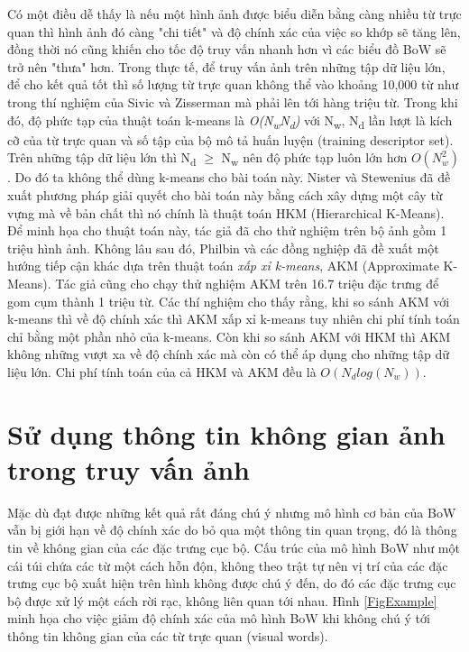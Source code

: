 Có một điều dễ thấy là nếu một hình ảnh được biểu diễn bằng càng nhiều từ trực quan thì hình ảnh đó càng "chi tiết" và độ chính xác của việc so khớp sẽ tăng lên, đồng thời nó cũng khiến cho tốc độ truy vấn nhanh hơn vì các biểu đồ BoW sẽ trở nên "thưa" hơn. Trong thực tế, để truy vấn ảnh trên những tập dữ liệu lớn, để cho kết quả tốt thì số lượng từ trực quan không thể vào khoảng 10,000 từ như trong thí nghiệm của Sivic và Zisserman \cite{sivic2003video} mà phải lên tới hàng triệu từ. Trong khi đó, độ phức tạp của thuật toán k-means là \textit{O(N\textsubscript{w}N\textsubscript{d})} với N\textsubscript{w}, N\textsubscript{d} lần lượt là kích cỡ của từ trực quan và số tập của bộ mô tả huấn luyện (training descriptor set). Trên những tập dữ liệu lớn thì N\textsubscript{d} $\geq$ N\textsubscript{w} nên độ phức tạp luôn lớn hơn $O(N^2_w)$. Do đó ta không thể dùng k-means cho bài toán này. Nister và Stewenius \cite{nister2006scalable} đã đề xuất phương pháp giải quyết cho bài toán này bằng cách xây dựng một cây từ vựng mà về bản chất thì nó chính là thuật toán HKM (Hierarchical K-Means). Để minh họa cho thuật toán này, tác giả đã cho thử nghiệm trên bộ ảnh gồm 1 triệu hình ảnh. Không lâu sau đó, Philbin và các đồng nghiệp \cite{philbin2007object} đã đề xuất một hướng tiếp cận khác dựa trên thuật toán \textit{xấp xỉ k-means}, AKM (Approximate K-Means). Tác giả cũng cho chạy thử nghiệm AKM trên 16.7 triệu đặc trưng để gom cụm thành 1 triệu từ. Các thí nghiệm cho thấy rằng, khi so sánh AKM với k-means thì về độ chính xác thì AKM xấp xỉ k-means tuy nhiên chi phí tính toán chỉ bằng một phần nhỏ của k-means. Còn khi so sánh AKM với HKM thì AKM không những vượt xa về độ chính xác mà còn có thể áp dụng cho những tập dữ liệu lớn. Chi phí tính toán của cả HKM và AKM đều là $O(N_d log(N_w))$.

\section{Sử dụng thông tin không gian ảnh trong truy vấn ảnh}
\label{spatial}

Mặc dù đạt được những kết quả rất đáng chú ý nhưng mô hình cơ bản của BoW vẫn bị giới hạn về độ chính xác do bỏ qua một thông tin quan trọng, đó là thông tin về không gian của các đặc trưng cục bộ. Cấu trúc của mô hình BoW như một cái túi chứa các từ một cách hỗn độn, không theo trật tự nên vị trí của các đặc trưng cục bộ xuất hiện trên hình không được chú ý đến, do đó các đặc trưng cục bộ được xử lý một cách rời rạc, không liên quan tới nhau. Hình \ref{FigExample} minh họa cho việc giảm độ chính xác của mô hình BoW khi không chú ý tới thông tin không gian của các từ trực quan (visual words).


